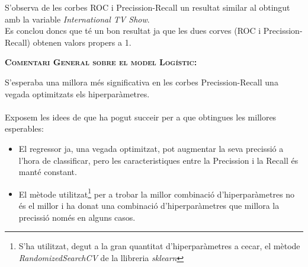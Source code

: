 \documentclass[a4paper, 11pt]{article}
\begin{document}
S'observa de les corbes ROC i Precission-Recall un resultat similar al obtingut amb la variable \textit{International TV Show}.\\
Es conclou doncs que té un bon resultat ja que les dues corves (ROC i Precission-Recall) obtenen valors propers a 1.
\newpage
\begin{center}
    \textsc{\textbf{Comentari General sobre el model Logístic:}}
\end{center}
S'esperaba una millora més significativa en les corbes Precission-Recall una vegada optimitzats els hiperparàmetres.\\\\
Exposem les idees de que ha pogut succeir per a que obtingues les millores esperables:
\begin{itemize}
    \item El regressor ja, una vegada optimitzat, pot augmentar la seva precissió a l'hora de classificar, pero les caracteristiques entre la Precission i la Recall és manté constant.
    \item El mètode utilitzat\footnote{S'ha utilitzat, degut a la gran quantitat d'hiperparàmetres a cecar, el mètode \textit{RandomizedSearchCV} de la llibreria \textit{sklearn} } per a trobar la millor combinació d'hiperparàmetres no és el millor i ha donat una combinació d'hiperparàmetres que millora la precissió només en alguns casos.
\end{itemize}

\newpage
\end{document}
